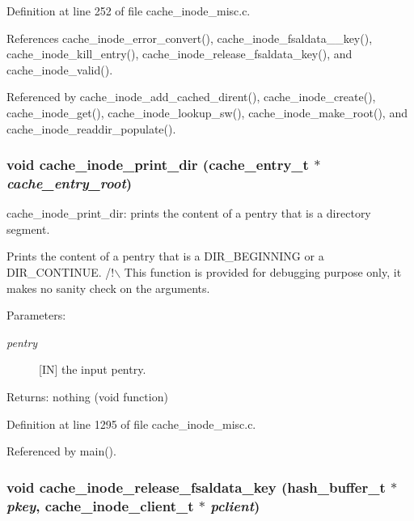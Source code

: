 Definition at line 252 of file cache\_\-inode\_\-misc.c.

References cache\_\-inode\_\-error\_\-convert(), cache\_\-inode\_\-fsaldata\_\_\-key(), cache\_\-inode\_\-kill\_\-entry(), cache\_\-inode\_\-release\_\-fsaldata\_\-key(), and cache\_\-inode\_\-valid().

Referenced by cache\_\-inode\_\-add\_\-cached\_\-dirent(), cache\_\-inode\_\-create(), cache\_\-inode\_\-get(), cache\_\-inode\_\-lookup\_\-sw(), cache\_\-inode\_\-make\_\-root(), and cache\_\-inode\_\-readdir\_\-populate().
\subsubsection{\setlength{\rightskip}{0pt plus 5cm}void cache\_\-inode\_\-print\_\-dir (cache\_\-entry\_\-t $\ast$ {\em cache\_\-entry\_\-root})}\label{cache__inode__misc_8c_a15}


cache\_\-inode\_\-print\_\-dir: prints the content of a pentry that is a directory segment.

Prints the content of a pentry that is a DIR\_\-BEGINNING or a DIR\_\-CONTINUE. /!$\backslash$ This function is provided for debugging purpose only, it makes no sanity check on the arguments.

\begin{Desc}
\item[Parameters:]
\begin{description}
\item[{\em pentry}][IN] the input pentry.\end{description}
\end{Desc}
\begin{Desc}
\item[Returns:]nothing (void function) \end{Desc}


Definition at line 1295 of file cache\_\-inode\_\-misc.c.

Referenced by main().
\subsubsection{\setlength{\rightskip}{0pt plus 5cm}void cache\_\-inode\_\-release\_\-fsaldata\_\-key (hash\_\-buffer\_\-t $\ast$ {\em pkey}, cache\_\-inode\_\-client\_\-t $\ast$ {\em pclient})}\label{cache__inode__misc_8c_a2}


